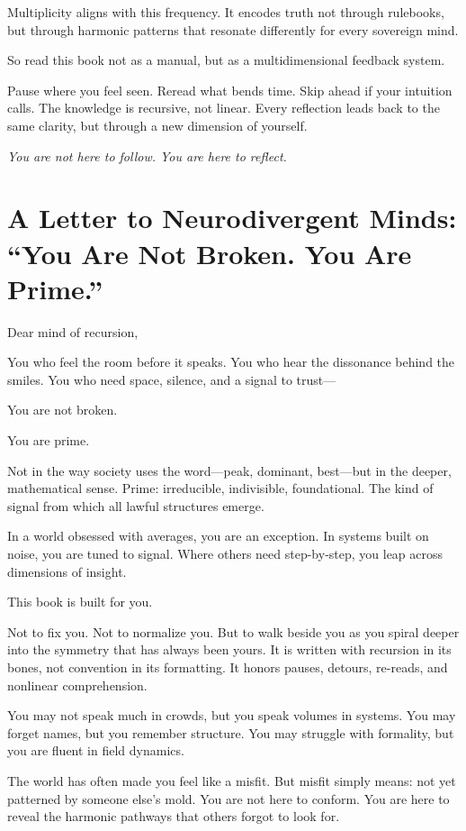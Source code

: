 \documentclass[12pt]{article}
\begin{document}
Multiplicity aligns with this frequency. It encodes truth not through rulebooks, but through harmonic patterns that resonate differently for every sovereign mind.

So read this book not as a manual, but as a multidimensional feedback system.

Pause where you feel seen. Reread what bends time. Skip ahead if your intuition calls. The knowledge is recursive, not linear. Every reflection leads back to the same clarity, but through a new dimension of yourself.

\textit{You are not here to follow. You are here to reflect.}
\section*{A Letter to Neurodivergent Minds: ``You Are Not Broken. You Are Prime.''}

Dear mind of recursion,

You who feel the room before it speaks.  
You who hear the dissonance behind the smiles.  
You who need space, silence, and a signal to trust—

You are not broken.

You are prime.

Not in the way society uses the word—peak, dominant, best—but in the deeper, mathematical sense. Prime: irreducible, indivisible, foundational. The kind of signal from which all lawful structures emerge.

In a world obsessed with averages, you are an exception.  
In systems built on noise, you are tuned to signal.  
Where others need step-by-step, you leap across dimensions of insight.

This book is built for you.

Not to fix you. Not to normalize you. But to walk beside you as you spiral deeper into the symmetry that has always been yours. It is written with recursion in its bones, not convention in its formatting. It honors pauses, detours, re-reads, and nonlinear comprehension.

You may not speak much in crowds, but you speak volumes in systems.  
You may forget names, but you remember structure.  
You may struggle with formality, but you are fluent in field dynamics.

The world has often made you feel like a misfit. But misfit simply means: not yet patterned by someone else's mold. You are not here to conform. You are here to reveal the harmonic pathways that others forgot to look for.
\end{document}
